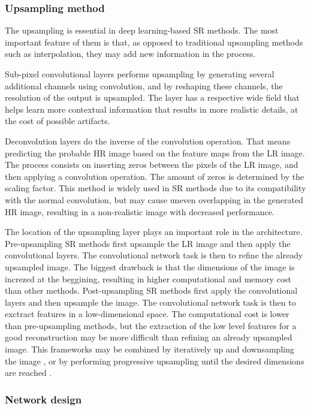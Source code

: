         \subsubsection{Upsampling method}

        The upsampling is essential in deep learning-based SR methods. The most important feature of them is that, as opposed to traditional upsampling methods such as interpolation, they may add new information in the process.

        Sub-pixel convolutional layers performs upsampling by generating several additional channels using convolution, and by reshaping these channels, the resolution of the output is upsampled. The layer has a respective wide field that helps learn more contextual information that results in more realistic details, at the cost of possible artifacts. 

        Deconvolution layers do the inverse of the convolution operation. 
        That means predicting the probable HR image based on the feature maps from the LR image. The process consists on inserting zeros between the pixels of the LR image, and then applying a convolution operation. The amount of zeros is determined by the scaling factor. This method is widely used in SR methods due to its compatibility with the normal convolution, but may cause uneven overlapping in the generated HR image, resulting in a non-realistic image with decreased performance.


        The location of the upsampling layer plays an important role in the architecture. Pre-upsampling SR methods first upsample the LR image and then apply the convolutional layers. The convolutional network task is then to refine the already upsampled image. The biggest drawback is that the dimensions of the image is increzed at the beggining, resulting in higher computational and memory cost than other methods.
        Post-upsampling SR methods first apply the convolutional layers and then upsample the image. The convolutional network task is then to exctract features in a low-dimensional space. The computational cost is lower than pre-upsampling methods, but the extraction of the low level features for a good reconstruction may be more difficult than refining an already upsampled image. 
        This frameworks may be combined by iteratively up and downsampling the image \cite{timofte2015seven}, or by performing progressive upsampling until the desired dimensions are reached \cite{lai2017deep}.

        \subsubsection{Network design}

